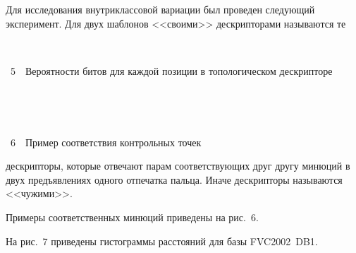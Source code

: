 \begin{multicols}{2}
      Для исследования внутриклассовой вариации был проведен следующий 
эксперимент. Для двух  шаблонов <<своими>> дескрипторами называются те\linebreak\vspace*{-12pt}
\begin{center} %
\vspace*{18pt}
\mbox{%
 \epsfxsize=65.974mm
}
\end{center}
\vspace*{3pt}
{{\figurename~5}\ \ \small{Вероятности битов для каждой позиции в топологическом дескрипторе}}


\addtocounter{figure}{2}

\begin{figure*}[b] %
 \vspace*{9pt}
 \begin{center}
 \mbox{%
 \epsfxsize=163.359mm
 }
 \end{center}
 \vspace*{-9pt}
\end{figure*}


\noindent
\begin{center} %
\vspace*{1pt}
\mbox{%
 \epsfxsize=78.512mm
}
\end{center}
\begin{center}
\vspace*{9pt}
{{\figurename~6}\ \ \small{Пример соответствия контрольных точек}}
\end{center}

\vspace*{6pt}


\noindent
 дескрипторы, которые отвечают парам соответствующих друг другу минюций в двух 
предъявлениях одного отпечатка пальца. Иначе дескрипторы называются <<чужими>>. 

Примеры соответственных минюций приведены на рис.~6. 

На рис.~7 приведены 
гистограммы расстояний для базы FVC2002~DB1.



\end{multicols}

